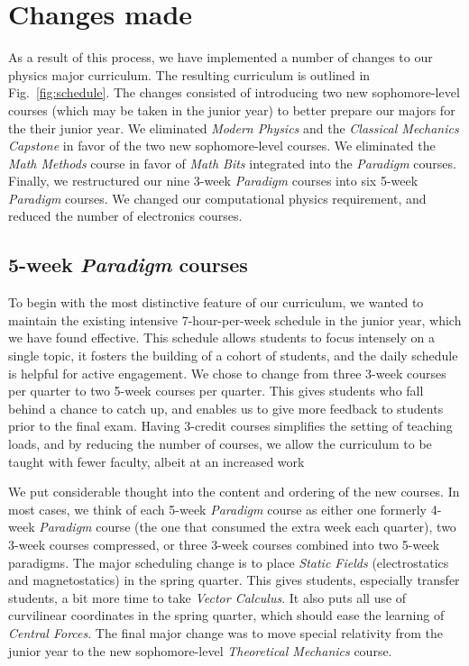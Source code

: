\documentclass[english,aps,pra,reprint,noshowpacs,superscriptaddress]{revtex4-1}
\begin{document}
\section{Changes made}
As a result of this process, we have implemented a number of changes
to our physics major curriculum.  The resulting curriculum is outlined
in Fig.~\ref{fig:schedule}.  The changes consisted of introducing two
new sophomore-level courses (which may be taken in the junior year) to
better prepare our majors for the their junior year.  We eliminated \emph{Modern
Physics} and the \emph{Classical Mechanics Capstone} in favor of the two new
sophomore-level courses.  We eliminated the \emph{Math Methods} course in
favor of \emph{Math Bits} integrated into the \emph{Paradigm} courses.
Finally, we restructured our nine 3-week \emph{Paradigm} courses into six
5-week \emph{Paradigm} courses.  We changed our computational physics requirement,
and reduced the number of electronics courses.

\subsection{5-week \emph{Paradigm} courses}
To begin with the most distinctive feature of our curriculum, we
wanted to maintain the existing intensive 7-hour-per-week schedule in
the junior year, which we have found effective.  This schedule allows students to focus
intensely on a single topic, it fosters the building of a cohort of students, and 
the daily schedule is helpful for active engagement.  We chose to
change from three 3-week courses per quarter to two 5-week courses
per quarter.  This gives students who fall behind a chance to catch up, and enables
us to give more feedback to students prior to the final exam.  Having 3-credit courses
simplifies the setting of teaching loads, and by reducing the number of courses, 
we allow the curriculum to be taught with fewer faculty, albeit at an increased work 

We put considerable thought into the content and ordering of the new
courses.  In most cases, we think of each 5-week \emph{Paradigm} course as either
one formerly 4-week \emph{Paradigm} course (the one that consumed the extra week
each quarter), two 3-week courses compressed, or three 3-week courses combined
into two 5-week paradigms.  The major
scheduling change is to place \emph{Static Fields} (electrostatics and
magnetostatics) in the spring quarter.  
This gives students, especially transfer students, 
a bit more time to take \emph{Vector Calculus}.  It also puts all use of
curvilinear coordinates in the spring quarter, which should ease the
learning of \emph{Central Forces}.  The final major change was to move
special relativity from the junior year to the new sophomore-level
\emph{Theoretical Mechanics} course.
\end{document}
